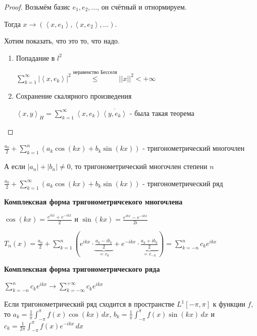 \begin{proof}
    Возьмём базис $e_1, e_2, \ldots$, он счётный и отнормируем.

    Тогда $x \rightarrow (\left < x, e_1 \right >, \left < x, e_2 \right >, \ldots)$.

    Хотим показать, что это то, что надо.

    \begin{enumerate}
        \item {
            Попадание в $l^2$

            $\sum\limits_{k = 1}^\infty |\left < x, e_k \right >|^2 \overset{\text{неравенство Бесселя}}{\leqslant} ||x||^2 < +\infty$
        }
        \item {
            Сохранение скалярного произведения

            $\left < x, y \right >_H = \sum\limits_{k = 1}^\infty \left < x, e_k \right > \overline{\left < y, e_k \right >}$ - была такая теорема
         }
    \end{enumerate}
\end{proof}


\begin{definition}
    $\frac{a_0}{2} + \sum_{k = 1}^n (a_k \cos (kx) + b_k \sin (kx))$ - тригонометрический многочлен

    А если $|a_n| + |b_n| \neq 0$, то тригонометрический многочлен степени $n$
\end{definition}

\begin{definition}
    $\frac{a_0}{2} + \sum_{k=1}^\infty (a_k \cos (kx) + b_k \sin (kx))$ - тригонометрический ряд
\end{definition}

\textbf{Комплексная форма тригонометричсекого многочлена}

$\cos (kx) = \frac{e^{ikx} + e^{-ikx}}{2}$ и $\sin (kx) = \frac{e^{ikx} - e^{-ikx}}{2i}$

$T_n (x) = \frac{a_0}{2} + \sum_{k = 1}^n \left ( e^{ikx} \cdot \underbrace{\frac{a_k - ib_k}{2}}_{=c_k} + e^{-ikx} \cdot \underbrace{\frac{a_k + ib_k}{2}}_{=c_{-k}} \right ) = \sum_{k = -n}^n c_k e^{ikx}$

\textbf{Комплексная форма тригонометрического ряда}

$\sum_{k = -n}^n c_k e^{ikx} \rightarrow \sum_{k = -\infty}^{+\infty} c_k e^{ikx}$

\begin{theorem}
    Если тригонометрический ряд сходится в пространстве $L^1 [-\pi, \pi]$ к функции $f$, то
    $a_k = \frac{1}{\pi} \int_{-\pi}^\pi f(x) \cos (kx) \, dx$, $b_k = \frac{1}{\pi} \int_{-\pi}^\pi f(x) \sin (kx) \, dx$ и
    $c_k = \frac{1}{2\pi} \int_{-\pi}^\pi f(x) e^{-ikx} \, dx$
\end{theorem}

